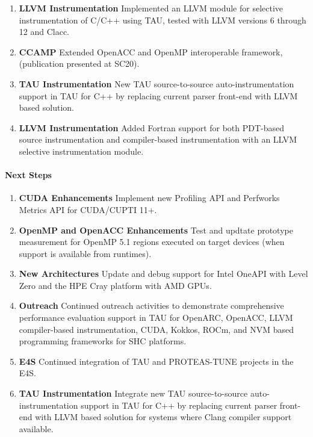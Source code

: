 \begin{enumerate}
\item \textbf{LLVM Instrumentation} Implemented an LLVM module for selective instrumentation of C/C++ using TAU, tested with LLVM versions 6 through 12 and Clacc.

\item \textbf{CCAMP} Extended OpenACC and OpenMP interoperable framework, (publication presented at SC20).

\item \textbf{TAU Instrumentation} New TAU source-to-source auto-instrumentation support in TAU for C++ by replacing current parser front-end with LLVM based solution.

\item \textbf{LLVM Instrumentation} Added Fortran support for both PDT-based source instrumentation and compiler-based instrumentation with an LLVM selective instrumentation module.

\end{enumerate}

\paragraph{Next Steps}
\begin{enumerate}
\item \textbf{CUDA Enhancements}
Implement new Profiling API and Perfworks Metrics API for CUDA/CUPTI 11+.

\item \textbf{OpenMP and OpenACC Enhancements}
Test and updtate prototype measurement for OpenMP 5.1 regions executed on target devices (when support is available from runtimes).

\item \textbf{New Architectures}
Update and debug support for Intel OneAPI with Level Zero and the HPE Cray platform with AMD GPUs.

\item \textbf{Outreach}
Continued outreach activities to demonstrate comprehensive performance evaluation support in TAU for OpenARC, OpenACC, LLVM compiler-based instrumentation, CUDA, Kokkos, ROCm, and NVM based programming frameworks for SHC platforms.

\item \textbf{E4S}
Continued integration of TAU and PROTEAS-TUNE projects in the E4S.

\item \textbf{TAU Instrumentation} Integrate new TAU source-to-source auto-instrumentation support in TAU for C++ by replacing current parser front-end with LLVM based solution for systems where Clang compiler support available.

\end{enumerate}
